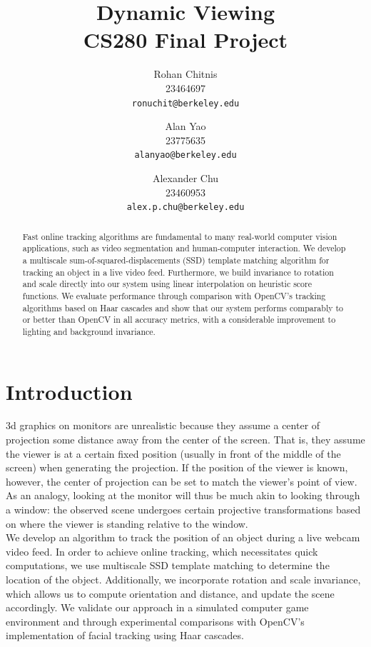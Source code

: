 \documentclass[10pt,twocolumn,letterpaper]{article}
\begin{document}
\title{Dynamic Viewing\\CS280 Final Project}

\author{Rohan Chitnis\\
23464697\\
{\tt\small ronuchit@berkeley.edu}
\and
Alan Yao\\
23775635\\
{\tt\small alanyao@berkeley.edu}
\and
Alexander Chu\\
23460953\\
{\tt\small alex.p.chu@berkeley.edu}
}

\maketitle

\begin{abstract}
  Fast online tracking algorithms are fundamental to many real-world computer
  vision applications, such as video segmentation and human-computer interaction.
  We develop a multiscale sum-of-squared-displacements (SSD) template matching algorithm for
  tracking an object in a live video feed. Furthermore, we build invariance
  to rotation and scale directly into our system using linear interpolation on heuristic
  score functions. We evaluate performance through comparison with OpenCV's tracking
  algorithms based on Haar cascades and show that our system performs comparably to or
  better than OpenCV in all accuracy metrics, with a considerable improvement to
  lighting and background invariance.
\end{abstract}

\section{Introduction}
3d graphics on monitors are unrealistic because they assume a center of projection
some distance away from the center of the screen. That is, they assume the viewer
is at a certain fixed position (usually in front of the middle of the screen) when
generating the projection. If the position of the viewer is known, however, the
center of projection can be set to match the viewer's point of view. As an analogy,
looking at the monitor will thus be much akin to looking through a window: the observed
scene undergoes certain projective transformations based on where the viewer is standing
relative to the window.\\

We develop an algorithm to track the position of an object
during a live webcam video feed. In order to achieve online tracking, which necessitates
quick computations, we use multiscale SSD template matching to determine the location of
the object. Additionally, we incorporate rotation and scale invariance, which allows us to
compute orientation and distance, and update the scene accordingly. We validate our
approach in a simulated computer game environment and through experimental comparisons
with OpenCV's implementation of facial tracking using Haar cascades.
\end{document}
